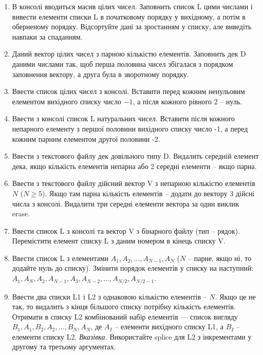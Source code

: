 \documentclass[a5paper,titlepage,openany,twoside,
]
{book_unv}%
\begin{document}
\begin{enumerate}
\item
В консолі вводиться масив цілих чисел. Заповнить список L цими
числами і вивести елементи списки L в початковому порядку у вихідному, а
потім в оберненому порядку. Відсортуйте дані за зростанням у списку, але виведіть
навпаки за спаданням.

\item
Даний вектор цілих чисел з парною кількістю елементів.
Заповнить дек D даними числами так, щоб перша половина чисел збігалася
з порядком заповнення вектору, а друга була в зворотному порядку.
 
\item
Ввести список цілих чисел з консолі. Вставити перед кожним ненульовим
елементом вихідного списку число $-1$, а після кожного рівного 2 -- нуль.
\item
Ввести з консолі список L натуральних чисел. Вставити після
кожного непарного елементу з першої половини вихідного списку число -1, а
перед кожним парним елементом другої половини -2.
\item
Ввести з текстового файлу дек довільного типу D. Видалить середній елемент дека, якщо
кількість елементів непарна або 2 середні елементи -- якщо парна.

\item
Ввести з текстового файлу дійсний вектор V з непарною кількістю елементів $N$ ($N \ge 5$).
Якщо там парна кількість елементів -- додати до вектору 3 дійсні числа з консолі.
Видалити три середні елементи вектора за один виклик erase.

\item
Ввести список L з консолі та вектор V з бінарного файлу (тип -- рядок). 
Перемістити елемент списку L з даним номером в кінець списку V.

\item
Ввести список L з елементами $A_1,A_2, \ldots, A_{N-1}, A_N$ ($N$ -- парне,
якщо ні, то додайте нуль до списку).
Змінити порядок елементів у списку на наступний: $A_1, A_N,
A_{2}, A_{N-1}, A_3, A_{N-2}, \ldots, A_{N/2}, A_{N/2-1}$.

\item
Ввести два списки L1 і L2 з однаковою кількістю елементів -- $N$.
Якщо це не так, то видалить з кінця більшого списку потрібну кількість
елементів. Отримати в списку L2 комбінований набір  елементів ---
список вигляду $B_1, A_1, B_2, A_2,\ldots, B_N, A_ N$, де $A_I$ --
елементи вихідного списку L1, а $B_I$ -- елементи списку L2.
\emph{Вказівка.} Використайте splice для L2 з інкрементами у другому та третьому аргументах. 
\end{enumerate}
\end{document}
